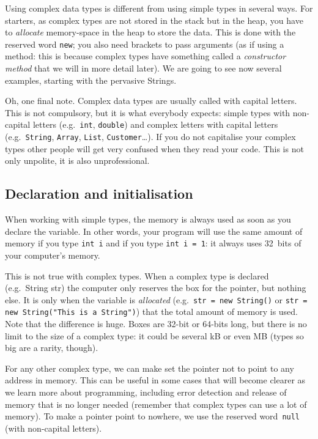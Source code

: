 Using complex data types is different from using simple types in
several ways. For starters, as complex types are not stored in the
stack but in the heap, you have to \emph{allocate} memory-space in the
heap to store the data. This is done with the reserved word
\verb+new+; you also need brackets to pass arguments (as if using a
method: this is because complex types have something called a
\emph{constructor method} that we will in more detail later). We are
going to see now several examples, starting with the pervasive
Strings. 

Oh, one final note. Complex data types are usually called with capital
letters. This is not compulsory, but it is what everybody expects:
simple types with non-capital letters (e.g.~\verb+int+, \verb+double+)
and complex letters with capital letters (e.g.~\verb+String+,
\verb+Array+, \verb+List+, \verb+Customer+\ldots). If you do not
capitalise your complex types other people will get very confused when
they read your code. This is not only unpolite, it is also
unprofessional. 

\subsection{Declaration and initialisation}
\label{sec:decl-init}

When working with simple types, the memory is always used as soon as
you declare the variable. In other words, your program will use the
same amount of memory if you type \verb+int i+ and if you type
\verb+int i = 1+: it always uses 32~bits of your computer's memory. 

This is not true with complex types. When a complex type is declared
(e.g.~String str) the computer only reserves the box for the pointer,
but nothing else. It is only when the variable is \emph{allocated}
(e.g.~\verb+str = new String()+ 
or \verb+str = new String("This is a String")+) that the total amount
of memory is used. Note that the difference is huge. Boxes are 32-bit
or 64-bits long, but there is no limit to the size of a complex type:
it could be several kB or even MB (types so big are a rarity,
though). 

For any other complex type, we can make set the pointer 
not to point to any address in memory. This can be useful in
some cases that will become clearer as we learn more about
programming, including error detection and release of memory that is
no longer needed (remember that complex types can use a lot of
memory). To make a pointer point to nowhere, we use the
reserved word~\verb+null+ (with non-capital letters).

